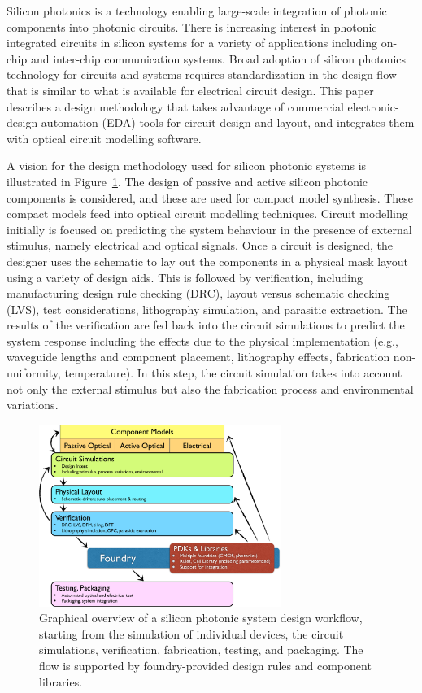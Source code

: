 \documentclass[journal]{spie}
\begin{document}
Silicon photonics is a technology enabling large-scale integration of photonic components into photonic circuits.  
There is increasing interest in photonic integrated circuits in silicon systems for a variety of applications including on-chip and inter-chip communication systems. Broad adoption of silicon photonics technology for circuits and systems requires standardization in the design flow that is similar to what is available for electrical circuit design. This paper describes a design methodology that takes advantage of commercial electronic-design automation (EDA) tools for circuit design and layout, and integrates them with optical circuit modelling software. 


A vision for the design methodology used for silicon photonic systems is illustrated in Figure~\ref{SiliconPhotonicsDesign_Overview}. 
The design of passive and active silicon photonic components is considered, and these are used for compact model synthesis.  These compact models feed into optical circuit modelling techniques.  Circuit modelling initially is focused on predicting the system behaviour in the presence of external stimulus, namely electrical and optical signals. Once a circuit is designed, the designer uses the schematic to lay out the components in a physical mask layout using a variety of design aids.  This is followed by verification, including manufacturing design rule checking (DRC), layout versus schematic checking (LVS), test considerations, lithography simulation, and parasitic extraction.  The results of the verification are fed back into the circuit simulations to predict the system response including the effects due to the physical implementation (e.g., waveguide lengths and component placement, lithography effects, fabrication non-uniformity, temperature).  In this step, the circuit simulation takes into account not only the external stimulus but also the fabrication process and environmental variations.


\begin{figure}[tbp]
	\centering
    	\includegraphics[width=0.7\textwidth]{../figs/SiliconPhotonicsDesign_Overview-crop}
        \caption[]{Graphical overview of a silicon photonic system design workflow, starting from the simulation of individual devices, the circuit simulations, verification, fabrication, testing, and packaging.  The flow is supported by foundry-provided design rules and component libraries. 
}
        \label{SiliconPhotonicsDesign_Overview}
\end{figure}
\end{document}

